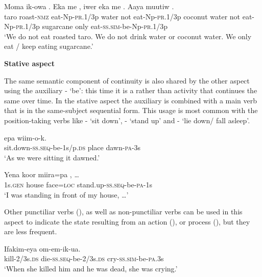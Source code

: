 \ea%
\label{ex:x1049}
\gll Moma ik-owa . Eka me , iwer eka me . Aaya muutiw .\\
taro roast-\textsc{nmz} eat-Np-\textsc{pr}.1/3p water not eat-Np-\textsc{pr}.1/3p coconut water not eat-Np-\textsc{pr}.1/3p sugarcane only eat-\textsc{ss}.\textsc{sim}-be-Np-\textsc{pr}.1/3p\\
\glt`We do not eat roasted taro. We do not drink water or coconut water. We only eat / keep eating sugarcane.'
\z

{\bfseries
{}
Stative aspect}

The same semantic component of continuity is also shared by the other aspect using the auxiliary - `be': this time it is a  rather than activity that continues the same over time. In the stative aspect the auxiliary is combined with a main verb that is in the same-subject sequential form. This usage is most common with the position-taking verbs like - `sit down', - `stand up' and - `lie down/ fall asleep'.

\ea%
\label{ex:x356}
\gll {}  epa wiim-o-k. \\
sit.down-\textsc{ss}.\textsc{seq}-be-1s/p.\textsc{ds} place dawn-\textsc{pa}-3s \\
\glt`As we were sitting it dawned.'
\z

\ea%
\label{ex:x1046}
\gll Yena koor miira=pa , {\dots} \\
1s.\textsc{gen} house face=\textsc{loc} stand.up-\textsc{ss}.\textsc{seq}-be-\textsc{pa}-1s\\
\glt`I was standing in front of my house, {\dots}'
\z

Other punctiliar verbs (), as well as non-punctiliar verbs can be used in this aspect to indicate the state resulting from an action (), or process (), but they are less frequent.

\ea%
\label{ex:x357}
\gll Ifakim-eya   om-em-ik-ua. \\
kill-2/3s.\textsc{ds} die-\textsc{ss}.\textsc{seq}-be-2/3s.\textsc{ds} cry-\textsc{ss}.\textsc{sim}-be-\textsc{pa}.3s\\
\glt`When she killed him and he was dead, she was crying.'
\z

